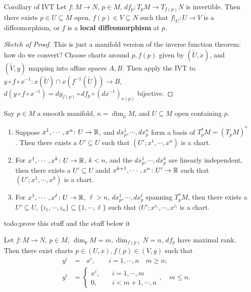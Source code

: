 \begin{namedthm}{Corollary of IVT}
    Let $f \colon M \to N$, $p \in M$, $df_p \colon T_pM \to T_{f(p)}N$ is invertible. Then there exists $p \in U \subseteq M$ open, $f(p) \in V \subseteq N$ such that $f|_U \colon U \to V$ is a diffeomorphism, or $f$ is a \textbf{local diffeomorphism} at $p$.
\end{namedthm}
\begin{proof}[Sketch of Proof]
    This is just a manifold version of the inverse function theorem: how do we convert? Choose charts around $p, f(p)$ given by $(\widetilde U, x)$, and $(\widetilde V, y)$ mapping into affine spaces $A,B$. Then apply the IVT to $y \circ f \circ x^{-1} \colon x(\widetilde U) \cap x(f ^{-1}(\widetilde U)) \to B$, $d(y \circ f \circ x ^{-1})=dy _{f(p)}\circ df_p \circ (dx^{-1})_{x(p)}$ bijective.
\end{proof}

\begin{prop}
    Say $p \in M$ a smooth manifold, $n=\dim_p M$, and $U \subseteq M$ open containing $p$.
    \begin{enumerate}[label=(\roman*)]
        \item Suppose $x^1,\cdots ,x^n  \colon U \to \mathbb{R}$, and $dx^1_p ,\cdots ,dx_p ^n $ form a basis of $T_p^*M=(T_pM)^*$. Then there exists a $U' \subseteq U$ such that $(U'; x^1,\cdots ,x^n )$ is a chart.
        \item For $x^1,\cdots ,x^k \colon U \to \mathbb{R}$, $k<n$, and the $dx_p^1,\cdots ,dx_p^k$ are linearly independent, then there exists a $U' \subseteq U$ andd $x^{k+1},\cdots ,x^n  \colon U' \to \mathbb{R}$ such that $(U' ; x^1,\cdots ,x^k)$ is a chart.
        \item For $x^1,\cdots ,x^{\ell}\colon U \to \mathbb{R}$, $\ell >n$, $dx_p^1,\cdots ,dx_p ^{\ell}$ spanning $T_p^*M$, then there exists a $U' \subseteq U$, $\{i_1,\cdots ,i_n \} \subseteq \{1,\cdots ,\ell\} $ such that $(U' ; x^{i_1},\cdots ,x^{i_{\ell}}$ is a chart.
    \end{enumerate}
\end{prop}
    {\color{red}todo:prove this stuff and the stuff below it} 
\begin{theorem}
    Let $f \colon M \to N$,  $p \in M$, $\dim _p M=m, \dim _{f(p)}N=n$, $df_p$ have maximal rank. Then there exist charts $p \in (U,x), f(p) \in (V,y)$ such that 
    \begin{align*}
        y^i &=\ \ \, x^i , \qquad i=1,\cdots ,n \quad m\geq n;\\
        y^i &=
        \begin{cases}
            x^i ,  \quad &i=1,\cdots ,m\\
            0,& i<m+1,\cdots ,n
        \end{cases}, \quad m \leq n.
    \end{align*}
\end{theorem}

